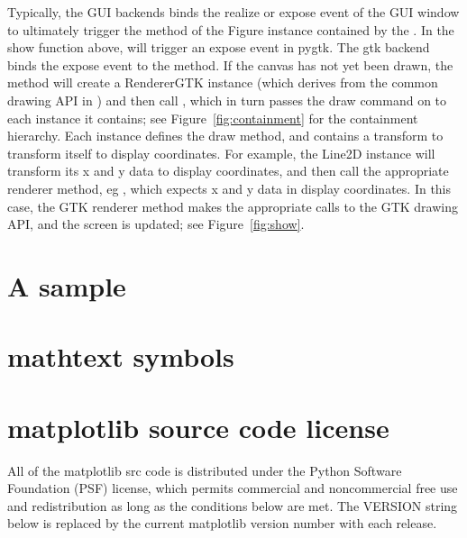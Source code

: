 \documentclass[twoside]{book}
\begin{document}
Typically, the GUI backends binds the realize or expose event of the
GUI window to ultimately trigger the  method of the
Figure instance contained by the .  In the show
function above,  will trigger an expose
event in pygtk.  The gtk backend binds the expose event to the
 method.  If the canvas has not yet
been drawn, the  method will create a RendererGTK
instance (which derives from the common drawing API in
) and then call
, which in turn passes the draw command on
to each  instance it contains; see
Figure~\ref{fig:containment} for the  containment
hierarchy.  Each  instance defines the draw method, and
contains a transform to transform itself to display coordinates.  For
example, the Line2D instance will transform its x and y data to
display coordinates, and then call the appropriate renderer method, eg
, which expects x and y data in display
coordinates.  In this case, the GTK renderer  method makes
the appropriate calls to the GTK drawing API, and the screen is
updated; see Figure~\ref{fig:show}.


\appendix

\chapter{A sample }
\label{cha:rc}


\chapter{mathtext symbols}
\label{cha:math_symbols}

\chapter{matplotlib source code license}
\label{cha:license}

All of the matplotlib src code is distributed under the Python
Software Foundation (PSF) license, which permits commercial and
noncommercial free use and redistribution as long as the conditions
below are met.  The VERSION string below is replaced by the current
matplotlib version number with each release.
\end{document}
